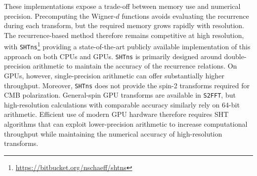 \documentclass[letters,usenatbib,useAMS]{mnras}
\begin{document}
These implementations expose a trade-off between memory use and numerical precision. Precomputing the Wigner-$d$ functions avoids evaluating the recurrence during each transform, but the required memory grows rapidly with resolution. The recurrence-based method therefore remains competitive at high resolution, with \texttt{SHTns}\footnote{\url{https://bitbucket.org/nschaeff/shtns}} providing a state-of-the-art publicly available implementation of this approach on both CPUs and GPUs. \texttt{SHTns} is primarily designed around double-precision arithmetic to maintain the accuracy of the recurrence relations. On GPUs, however, single-precision arithmetic can offer substantially higher throughput. Moreover, \texttt{SHTns} does not provide the spin-2 transforms required for CMB polarization. General-spin GPU transforms are available in \texttt{S2FFT}, but high-resolution calculations with comparable accuracy similarly rely on 64-bit arithmetic. Efficient use of modern GPU hardware therefore requires SHT algorithms that can exploit lower-precision arithmetic to increase computational throughput while maintaining the numerical accuracy of high-resolution transforms.


\end{document}
